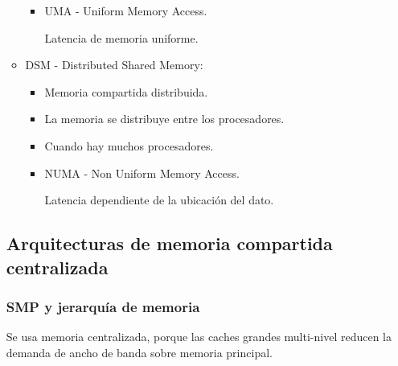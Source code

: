 \documentclass[12pt, twoside, openright]{report} %
\begin{document}
\begin{itemize}
\begin{itemize}
\begin{itemize}
			            \item UMA - Uniform Memory Access.

			                  Latencia de memoria uniforme.
			                  \begin{figure}[H]
				                  {\def\svgwidth{.6\textwidth}
					                  }
			                  \end{figure}
		            \end{itemize}

		      \item DSM - Distributed Shared Memory:
		            \begin{itemize}
			            \item Memoria compartida distribuida.
			            \item La memoria se distribuye entre los procesadores.
			            \item Cuando hay muchos procesadores.
			            \item NUMA - Non Uniform Memory Access.

			                  Latencia dependiente de la ubicación del dato.
			                  \begin{figure}[H]
				                  {\def\svgwidth{.6\textwidth}
					                  }
			                  \end{figure}
		            \end{itemize}
	      \end{itemize}



	      \subsection{Arquitecturas de memoria compartida centralizada}

	      \subsubsection{SMP y jerarquía de memoria}



	      Se usa memoria centralizada, porque las caches grandes
	      multi-nivel reducen la demanda de ancho de banda sobre memoria
	      principal.


\end{itemize}
\end{document}
